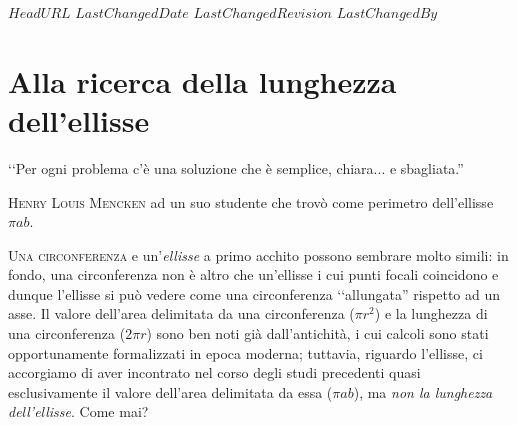 \svnidlong
{$HeadURL$}
{$LastChangedDate$}
{$LastChangedRevision$}
{$LastChangedBy$}

\chapter{Alla ricerca della lunghezza dell'ellisse}

\begin{introduction}
‘‘Per ogni problema c'è una soluzione che è semplice, chiara... e sbagliata.''
\begin{flushright}
	\textsc{Henry Louis Mencken} ad un suo studente che trovò come perimetro dell'ellisse $\pi ab$.
\end{flushright}
\end{introduction}
\lettrine[findent=1pt, nindent=0pt]{U}{na circonferenza} e un'\emph{ellisse} a primo acchito possono sembrare molto simili: in fondo, una circonferenza non è altro che un'ellisse i cui punti focali coincidono e dunque l'ellisse si può vedere come una circonferenza ‘‘allungata'' rispetto ad un asse. Il valore dell'area delimitata da una circonferenza ($\pi r^2$) e la lunghezza di una circonferenza ($2\pi r$) sono ben noti già dall'antichità, i cui calcoli sono stati opportunamente formalizzati in epoca moderna; tuttavia, riguardo l'ellisse, ci accorgiamo di aver incontrato nel corso degli studi precedenti quasi esclusivamente il valore dell'area delimitata da essa ($\pi ab$), ma \emph{non la lunghezza dell'ellisse}. Come mai?
